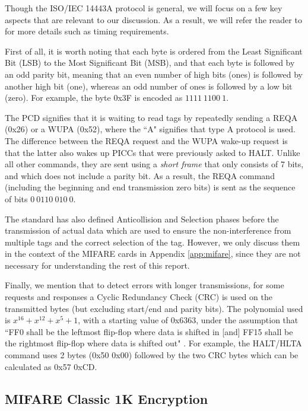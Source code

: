 \documentclass[fleqn,10pt]{SelfArx} %
\begin{document}
Though the ISO/IEC 14443A protocol is general, we will focus on a few key aspects that are relevant to our discussion. As a result, we will refer the reader to \cite{iso144433} for more details such as timing requirements.

First of all, it is worth noting that each byte is ordered from the Least Significant Bit (LSB) to the Most Significant Bit (MSB), and that each byte is followed by an odd parity bit, meaning that an even number of high bits (ones) is followed by another high bit (one), whereas an odd number of ones is followed by a low bit (zero). For example, the byte 0x3F is encoded as $1111\ 1100\ 1$.

The PCD signifies that it is waiting to read tags by repeatedly sending a REQA (0x26) or a WUPA (0x52), where the ``A" signifies that type A protocol is used. The difference between the REQA request and the WUPA wake-up request is that the latter also wakes up PICCs that were previously asked to HALT. Unlike all other commands, they are sent using a {\em short frame} that only consists of 7 bits, and which does not include a parity bit. As a result, the REQA command (including the beginning and end transmission zero bits) is sent as the sequence of bits $0\ 0110\ 010\ 0$.

The standard has also defined Anticollision and Selection phases before the transmission of actual data which are used to ensure the non-interference from multiple tags and the correct selection of the tag. However, we only discuss them in the context of the MIFARE cards in Appendix \ref{app:mifare}, since they are not necessary for understanding the rest of this report. 

Finally, we mention that to detect errors with longer transmissions, for some requests and responses a Cyclic Redundancy Check (CRC) is used on the transmitted bytes (but excluding start/end and parity bits). The polynomial used is $x^{16}+x^{12}+x^5+1$, with a starting value of 0x6363, under the assumption that ``FF0 shall be the leftmost flip-flop where data is shifted in  [and] FF15 shall be the rightmost flip-flop where data is shifted out" \cite{iso144433}. For example, the HALT/HLTA command uses 2 bytes (0x50 0x00) followed by the two CRC bytes which can be calculated as 0x57 0xCD.

\subsection{MIFARE Classic 1K Encryption}
\label{subsec:crypto1}
\end{document}
